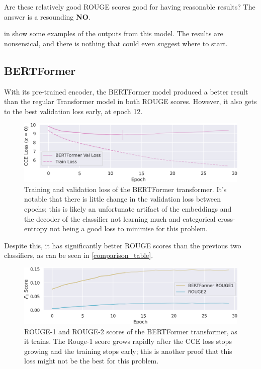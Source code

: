 Are these relatively good ROUGE scores good for having reasonable results?
The answer is a resounding \textbf{NO}.

 in \appendixA show some examples of the outputs from this model.
The results are nonsensical, and there is nothing that could even suggest where to start.

\subsection{BERTFormer}

With its pre-trained encoder, the BERTFormer model produced a better result than the regular Transformer model in both ROUGE scores.
However, it also gets to the best validation loss early, at epoch 12.

\begin{figure}[h]
	\includegraphics[width=\textwidth]{bertformer_loss.png}
	\caption{Training and validation loss of the BERTFormer transformer. It's notable that there is little change in the validation loss between epochs; this is likely an unfortunate artifact of the embeddings and the decoder of the classifier not learning much and categorical cross-entropy not being a good loss to minimise for this problem.}
\end{figure}

Despite this, it has significantly better ROUGE scores than the previous two classifiers, as can be seen in \cref{comparison_table}.

\begin{figure}[h]
	\includegraphics[width=\textwidth]{bertformer_rouge.png}
	\caption{ROUGE-1 and ROUGE-2 scores of the BERTFormer transformer, as it trains. The Rouge-1 score grows rapidly after the CCE loss stops growing and the training stops early; this is another proof that this loss might not be the best for this problem.}
\end{figure}

